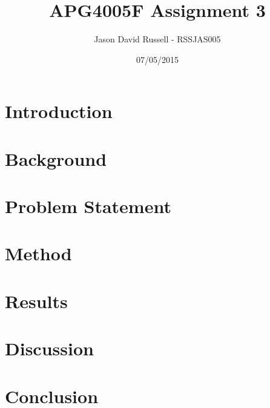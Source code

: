 \documentclass{article}
\title{APG4005F Assignment 3}
\date{07/05/2015}
\author{Jason David Russell - RSSJAS005}
\begin{document}
\maketitle
{}

\newpage
\tableofcontents


\newpage
\section{Introduction}


\section{Background}

\section{Problem Statement}

\section{Method}

\section{Results}

\section{Discussion}

\section{Conclusion}
\end{document}
